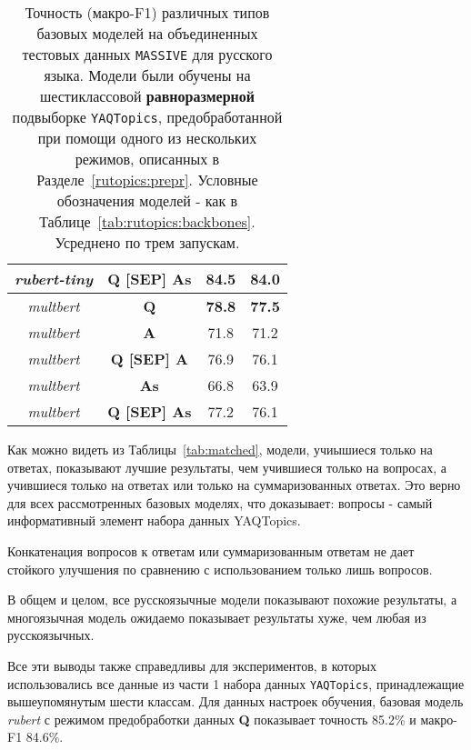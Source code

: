 \begin{table*}
{\begin{tabular}{|c|c||c|c|}
\textit{rubert-tiny} &  \textbf{Q [SEP] As} & \textbf{84.5} & \textbf{84.0}\\ \hline \hline%
\textit{multbert} &  \textbf{Q} & \textbf{78.8} & \textbf{77.5}\\ \hline%
\textit{multbert} &  \textbf{A} & 71.8 & 71.2\\ \hline%
\textit{multbert} &  \textbf{Q [SEP] A} & 76.9 & 76.1\\ \hline%
\textit{multbert} &  \textbf{As} & 66.8 & 63.9\\ \hline%
\textit{multbert} &  \textbf{Q [SEP] As} & 77.2 & 76.1\\ \hline%
\end{tabular}
}
\caption{
 Точность (макро-F1) различных типов базовых моделей на объединенных тестовых данных \texttt{MASSIVE} для русского языка.
Модели были обучены на шестиклассовой \textbf{равноразмерной} подвыборке \texttt{YAQTopics}, предобработанной при помощи одного из нескольких режимов, описанных в Разделе~\ref{rutopics:prepr}. Условные обозначения моделей - как в  Таблице~\ref{tab:rutopics:backbones}. Усреднено по трем запускам.}
\label{tab:rutopics:matched}
\end{table*}

Как можно видеть из Таблицы~\ref{tab:matched}, модели, учиышиеся только на ответах, показывают лучшие результаты, чем учившиеся только на вопросах, а учившиеся только на ответах или только на суммаризованных ответах. Это верно для всех рассмотренных базовых моделях, что доказывает: вопросы - самый информативный элемент набора данных {YAQTopics}. 

Конкатенация вопросов к ответам или суммаризованным ответам не дает стойкого улучшения по сравнению с использованием только лишь вопросов. 

В общем и целом, все русскоязычные модели показывают похожие результаты, а многоязычная модель ожидаемо показывает результаты хуже, чем любая из русскоязычных. 

Все эти выводы также справедливы для экспериментов, в которых использовались все данные из части 1 набора данных \texttt{YAQTopics}, принадлежащие вышеупомянутым шести классам. Для данных настроек обучения, базовая модель \textit{rubert} с режимом предобработки данных \textbf{Q} показывает точность 85.2\% и макро-F1 84.6\%.

